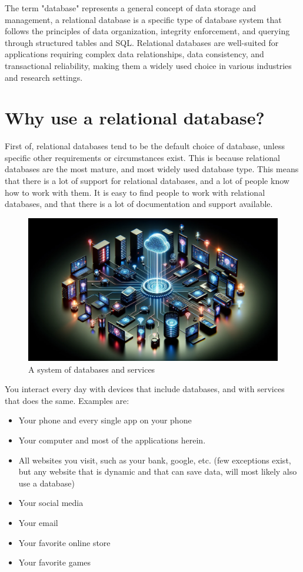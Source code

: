 The term "database" represents a general concept of data storage and management, a relational database is a specific type of database system that follows the principles of data organization, integrity enforcement, and querying through structured tables and SQL. Relational databases are well-suited for applications requiring complex data relationships, data consistency, and transactional reliability, making them a widely used choice in various industries and research settings.

\section{Why use a relational database?}
First of, relational databases tend to be the default choice of database, unless specific other requirements or circumstances exist. This is because relational databases are the most mature, and most widely used database type. This means that there is a lot of support for relational databases, and a lot of people know how to work with them. It is easy to find people to work with relational databases, and that there is a lot of documentation and support available.

\begin{figure}[h]
    \centering
    \includegraphics[width=1\textwidth]{content/1-relational-databases/figures/i1-databases-everywhere.png}
    \caption{A system of databases and services}
    \label{fig:0.i1-databases-everywhere.png}
\end{figure}

You interact every day with devices that include databases, and with services that does the same. Examples are:

\begin{itemize}
    \item Your phone and every single app on your phone
    \item Your computer and most of the applications herein.
    \item All websites you visit, such as your bank, google, etc. (few exceptions exist, but any website that is dynamic and that can save data, will most likely also use a database)
    \item Your social media
    \item Your email
    \item Your favorite online store
    \item Your favorite games
\end{itemize}

